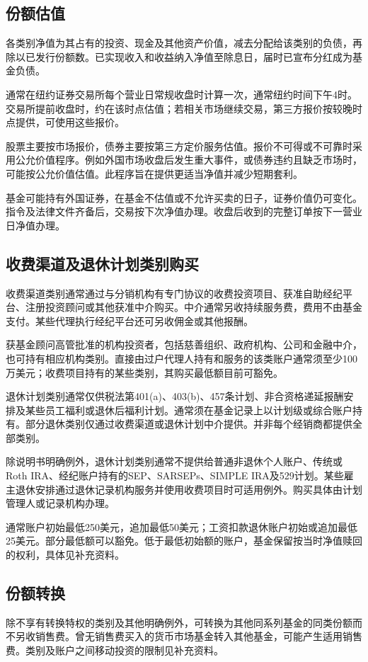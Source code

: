 \documentclass[UTF8,fontset=none,11pt,a4paper]{ctexart}
\begin{document}
\subsection*{份额估值}
各类别净值为其占有的投资、现金及其他资产价值，减去分配给该类别的负债，再除以已发行份额数。已实现收入和收益纳入净值至除息日，届时已宣布分红成为基金负债。


通常在纽约证券交易所每个营业日常规收盘时计算一次，通常纽约时间下午4时。交易所提前收盘时，约在该时点估值；若相关市场继续交易，第三方报价按较晚时点提供，可使用这些报价。


股票主要按市场报价，债券主要按第三方定价服务估值。报价不可得或不可靠时采用公允价值程序。例如外国市场收盘后发生重大事件，或债券违约且缺乏市场时，可能按公允价值估值。此程序旨在提供更适当净值并减少短期套利。


基金可能持有外国证券，在基金不估值或不允许买卖的日子，证券价值仍可变化。指令及法律文件齐备后，交易按下次净值办理。收盘后收到的完整订单按下一营业日净值办理。


\subsection*{收费渠道及退休计划类别购买}
收费渠道类别通常通过与分销机构有专门协议的收费投资项目、获准自助经纪平台、注册投资顾问或其他获准中介购买。中介通常另收持续服务费，费用不由基金支付。某些代理执行经纪平台还可另收佣金或其他报酬。


获基金顾问高管批准的机构投资者，包括慈善组织、政府机构、公司和金融中介，也可持有相应机构类别。直接由过户代理人持有和服务的该类账户通常须至少100万美元；收费项目持有的某些类别，其购买最低额目前可豁免。


退休计划类别通常仅供税法第401(a)、403(b)、457条计划、非合资格递延报酬安排及某些员工福利或退休后福利计划。通常须在基金记录上以计划级或综合账户持有。部分退休类别仅通过收费渠道或退休计划中介提供。并非每个经销商都提供全部类别。


除说明书明确例外，退休计划类别通常不提供给普通非退休个人账户、传统或Roth IRA、经纪账户持有的SEP、SARSEPs、SIMPLE IRA及529计划。某些雇主退休安排通过退休记录机构服务并使用收费项目时可适用例外。购买具体由计划管理人或记录机构办理。


通常账户初始最低250美元，追加最低50美元；工资扣款退休账户初始或追加最低25美元。部分最低额可以豁免。低于最低初始额的账户，基金保留按当时净值赎回的权利，具体见补充资料。


\subsection*{份额转换}
除不享有转换特权的类别及其他明确例外，可转换为其他同系列基金的同类份额而不另收销售费。曾无销售费买入的货币市场基金转入其他基金，可能产生适用销售费。类别及账户之间移动投资的限制见补充资料。
\end{document}
